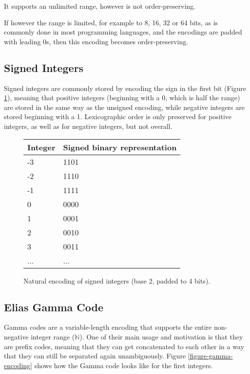 \documentclass{acm_proc_article-sp}
\begin{document}
It supports an unlimited range, however is not order-preser\-ving.

If however the range is limited, for example to 8, 16, 32 or 64 bits, as is commonly done in most programming languages, and the encodings are padded with leading 0s, then this encoding becomes order-preserving.

\subsection{Signed Integers}

Signed integers are commonly stored by encoding the sign in the first bit (Figure \ref{figure-natural-signed-encoding}), meaning that positive integers (beginning with a 0, which is half the range) are stored in the same way as the unsigned encoding, while negative integers are stored beginning with a 1. Lexicographic order is only preserved for positive integers, as well as for negative integers, but not overall.

\begin{figure}[p]
\caption{Natural encoding of signed integers (base 2, padded to 4 bits).}
\label{figure-natural-signed-encoding}
\center
\begin{tabular}{|l|l|}
\hline
Integer & Signed binary representation \\
\hline
-3 & 1101 \\
\hline
-2 & 1110 \\
\hline
-1 & 1111 \\
\hline
0 & 0000 \\
\hline
1 & 0001 \\
\hline
2 & 0010 \\
\hline
3 & 0011 \\
\hline
... & ... \\
\hline
\end{tabular}
\end{figure}

\subsection{Elias Gamma Code}
\label{section-gamma-code}

Gamma codes are a variable-length encoding that supports the entire non-negative integer range ($\mathbb{N}$). One of their main usage and motivation is that they are prefix codes, meaning that they can get concatenated to each other in a way that they can still be separated again unambiguously. Figure \ref{figure-gamma-encoding} shows how the Gamma code looks like for the first integers.
\end{document}
